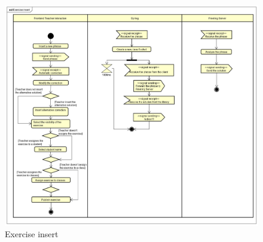 \begin{figure}[H]
\centering
\includegraphics[width=17cm, keepaspectratio]{img/Exercise-insert.png} 
\caption{Exercise insert}
\end{figure}

